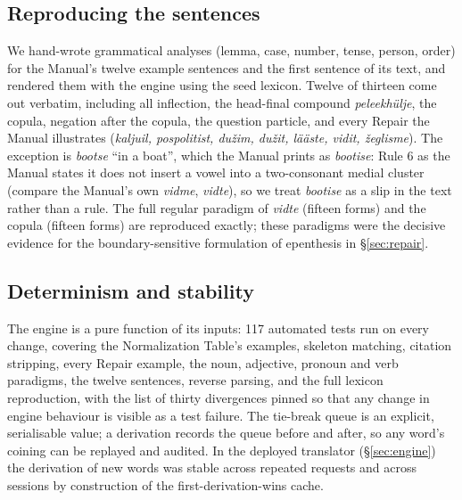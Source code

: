 \subsection{Reproducing the sentences}\label{sec:eval-sent}
We hand-wrote grammatical analyses (lemma, case, number, tense, person, order) for the Manual's twelve example sentences and the first sentence of its text, and rendered them with the engine using the seed lexicon. Twelve of thirteen come out verbatim, including all inflection, the head-final compound \emph{peleekhülje}, the copula, negation after the copula, the question particle, and every Repair the Manual illustrates (\emph{kaljuil, pospolitist, dužim, dužit, lääste, vidit, žeglisme}). The exception is \emph{bootse} ``in a boat'', which the Manual prints as \emph{bootise}: Rule 6 as the Manual states it does not insert a vowel into a two-consonant medial cluster (compare the Manual's own \emph{vidme}, \emph{vidte}), so we treat \emph{bootise} as a slip in the text rather than a rule. The full regular paradigm of \emph{vidte} (fifteen forms) and the copula (fifteen forms) are reproduced exactly; these paradigms were the decisive evidence for the boundary-sensitive formulation of epenthesis in \S\ref{sec:repair}.

\subsection{Determinism and stability}
The engine is a pure function of its inputs: 117 automated tests run on every change, covering the Normalization Table's examples, skeleton matching, citation stripping, every Repair example, the noun, adjective, pronoun and verb paradigms, the twelve sentences, reverse parsing, and the full lexicon reproduction, with the list of thirty divergences pinned so that any change in engine behaviour is visible as a test failure. The tie-break queue is an explicit, serialisable value; a derivation records the queue before and after, so any word's coining can be replayed and audited. In the deployed translator (\S\ref{sec:engine}) the derivation of new words was stable across repeated requests and across sessions by construction of the first-derivation-wins cache.
